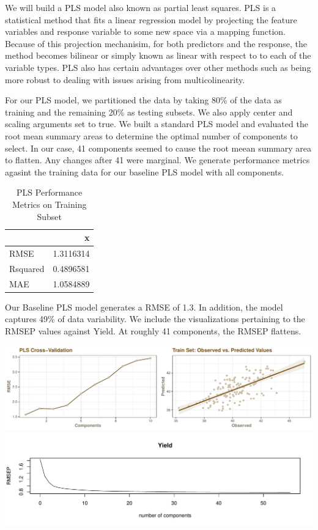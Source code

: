 \documentclass[]{report}
\begin{document}
We will build a PLS model also known as partial least squares. PLS is a
statistical method that fits a linear regression model by projecting the
feature variables and response variable to some new space via a mapping
function. Because of this projection mechanisim, for both predictors and
the response, the method becomes bilinear or simply known as linear with
respect to to each of the variable types. PLS also has certain
advantages over other methods such as being more robust to dealing with
issues arising from multicolinearity.

For our PLS model, we partitioned the data by taking 80\% of the data as
training and the remaining 20\% as testing subsets. We also apply center
and scaling arguments set to true. We built a standard PLS model and
evaluated the root mean summary areas to determine the optimal number of
components to select. In our case, 41 components seemed to cause the
root meean summary area to flatten. Any changes after 41 were marginal.
We generate performance metrics agasint the training data for our
baseline PLS model with all components.

\begin{table}[H]

\caption{\label{tab:kj-6.3c}PLS Performance Metrics on Training Subset}
\centering
\begin{tabular}[t]{l|r}
\hline
  & x\\
\hline
\rowcolor{gray!6}  RMSE & 1.3116314\\
\hline
Rsquared & 0.4896581\\
\hline
\rowcolor{gray!6}  MAE & 1.0584889\\
\hline
\end{tabular}
\end{table}

Our Baseline PLS model generates a RMSE of 1.3. In addition, the model
captures 49\% of data variability. We include the visualizations
pertaining to the RMSEP values against Yield. At roughly 41 components,
the RMSEP flattens.

\includegraphics{Homework-Two_files/figure-latex/kj-6.3c2-1.pdf}
\includegraphics{Homework-Two_files/figure-latex/kj-6.3c2-2.pdf}
\end{document}
